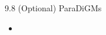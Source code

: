 \begin{frame}{9.8 (Optional) ParaDiGMs}
    \begin{itemize}
        \item
    \end{itemize}
\end{frame}
